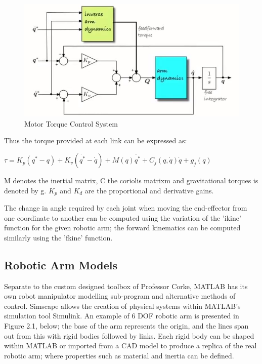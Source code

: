 \documentclass[12pt,openany,a4paper]{book}
\begin{document}
\begin{center}
\begin{figure}[htb]
  \includegraphics[width=\linewidth]{Correcting_for_disturbance_torque.jpg}
\caption{Motor Torque Control System}
\end{figure}
\end{center}

Thus the torque provided at each link can be expressed as:

\begin{center}

$\tau = K_p (q^{*} - q) + K_v (\dot{q^{*}} - \dot{q}) + M(q) \ddot{q^{*}} + C_j (q, \dot{q}) \dot{q} + g_j (q)$

\end{center}


M denotes the inertial matrix, C the coriolis matrixm and gravitational torques is denoted by g. $K_p$ and $K_d$ are the proportional and derivative gains.

The change in angle required by each joint when moving the end-effector from one coordinate to another can be computed using the variation of the 'ikine' function for the given robotic arm; the forward kinematics can be computed similarly using the 'fkine' function.

\subsection{Robotic Arm Models}
Separate to the custom designed toolbox of Professor Corke, MATLAB has its own robot manipulator modelling sub-program and alternative methods of control. Simscape allows the creation of physical systems within MATLAB's simulation tool Simulink. An example of 6 DOF robotic arm is presented in Figure 2.1, below; the base of the arm represents the origin, and the lines span out from this with rigid bodies followed by links. Each rigid body can be shaped within MATLAB or imported from a CAD model to produce a replica of the real robotic arm; where properties such as material and inertia can be defined.
\end{document}
